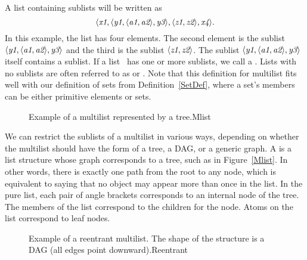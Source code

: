 A list containing sublists will be written as
\[\langle {\textit{x1}}, \langle {\textit{y1}},
\langle {\textit{a1}}, {\textit{a2}}\rangle, {\textit{y3}}\rangle,
\langle {\textit{z1}}, {\textit{z2}}\rangle, {\textit{x4}}\rangle.\]
\noindent In this example, the list has four elements.
The second element is the sublist
\(\langle {\textit{y1}}, \langle{\textit{a1}}, {\textit{a2}}\rangle,
{\textit{y3}}\rangle\) and the
third is the sublist \(\langle{\textit{z1}}, {\textit{z2}}\rangle\).
The sublist \(\langle{\textit{y1}}, \langle{\textit{a1}}, {\textit{a2}}\rangle,
{\textit{y3}}\rangle\) 
itself contains a sublist.
If a list~ has one or more sublists, we call  a
.
Lists with no sublists are often referred to as  or
.
Note that this definition for multilist fits well with our definition
of sets from Definition~\ref{SetDef}, where a set's members can be
either primitive elements or sets.

\begin{figure}
\vspace{-\bigskipamount}\vspace{-\bigskipamount}
{Example of a multilist represented by a tree.}{Mlist}
\vspace{-\smallskipamount}
\end{figure}

We can restrict the sublists of a multilist in various ways, depending
on whether the multilist should have the form of a tree, a DAG, or a
generic graph.
A  is a list structure whose graph corresponds to a
tree, such as in Figure~\ref{Mlist}.
In other words, there is exactly one path from the root to any node,
which is equivalent to saying that no object may appear more than once
in the list.
In the pure list, each pair of angle brackets corresponds to an internal
node of the tree.
The members of the list correspond to the children for the node.
Atoms on the list correspond to leaf nodes.

\begin{figure}
\vspace{-\bigskipamount}\vspace{-\medskipamount}
{Example of a reentrant multilist.
The shape of the structure is a DAG (all edges point downward).}{Reentrant}
\end{figure}

